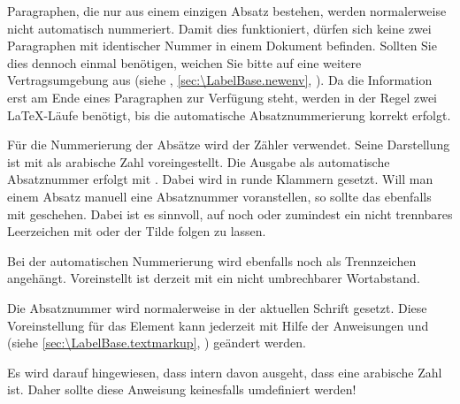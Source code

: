 Paragraphen, die nur aus einem einzigen Absatz bestehen, werden normalerweise
nicht automatisch nummeriert. Damit dies funktioniert, dürfen sich keine zwei
Paragraphen mit identischer Nummer in einem Dokument befinden. Sollten Sie
dies dennoch einmal benötigen, weichen Sie bitte auf eine weitere
Vertragsumgebung aus (siehe
,
\autoref{sec:\LabelBase.newenv},
). Da
die Information erst am Ende eines Paragraphen zur Verfügung steht, werden in
der Regel zwei \LaTeX-Läufe benötigt, bis die automatische Absatznummerierung
korrekt erfolgt.%
\EndIndexGroup

\begin{Declaration}
\end{Declaration}%
Für die Nummerierung der Absätze wird der Zähler 
verwendet. Seine Darstellung  ist mit
 als arabische Zahl
voreingestellt. Die Ausgabe als automatische
Absatznummer erfolgt mit . Dabei wird  in runde
Klammern gesetzt. Will man einem Absatz manuell eine Absatznummer
voranstellen, so sollte das ebenfalls mit  geschehen. Dabei
ist es sinnvoll, auf  noch  oder
zumindest ein nicht trennbares Leerzeichen mit
 oder der Tilde folgen zu lassen.

Bei der automatischen Nummerierung wird
 ebenfalls noch  als Trennzeichen
angehängt. Voreinstellt ist derzeit mit
 ein nicht umbrechbarer
Wortabstand.

%
Die Absatznummer wird normalerweise in der
aktuellen Schrift gesetzt. Diese Voreinstellung für das Element
 kann jederzeit mit Hilfe der Anweisungen
%
 und
 (siehe
\autoref{sec:\LabelBase.textmarkup}, )
geändert werden.%
%

Es wird darauf hingewiesen, dass  intern
davon ausgeht, dass  eine arabische Zahl ist. Daher sollte
diese Anweisung keinesfalls umdefiniert werden!%
\EndIndexGroup


